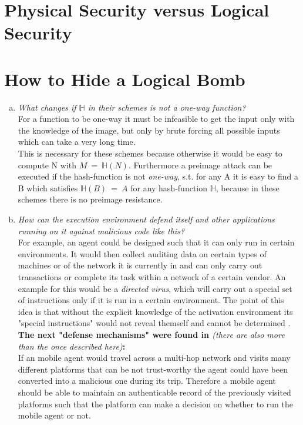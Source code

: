 \documentclass{report}
\begin{document}
	\pagestyle{fancy}
	

	\section{Physical Security versus Logical Security}
	\startsection
		\cite{DG99} \cite{IGDC}
	\closesection
	
	\section{How to Hide a Logical Bomb}
	\startsection
		\begin{enumerate}[a)]
			\item \textit{What changes if $\mathbb{H}$ in their schemes is not a one-way function?} \\
			For a function to be one-way it must be infeasible to get the input only with the knowledge of the image, but only by brute forcing all possible inputs which can take a very long time. \\
			This is necessary for these schemes because otherwise it would be easy to compute N with $M \ = \ \mathbb{H}(N)$. Furthermore a preimage attack can be executed if the hash-function is not \textit{one-way}, s.t. for any A it is easy to find a B which satisfies $\mathbb{H}(B) \ = \ A$ for any hash-function $\mathbb{H}$, because in these schemes there is no preimage resistance.
			\item \textit{How can the execution environment defend itself and other applications running on it against malicious code like this?} \\
			For example, an agent could be designed such that it can only run in certain environments. It would then collect auditing data on certain types of machines or of the network it is currently in and can only carry out transactions or complete its task within a network of a certain vendor. An example for this would be a \textit{directed virus}, which will carry out a special set of instructions only if it is run in a certain environment. The point of this idea is that without the explicit knowledge of the activation environment its "special instructions" would not reveal themself and cannot be determined \cite{Riordan1998EnvironmentalKG}. \\
			\textbf{The next "defense mechanisms" were found in \cite{AB05}} \textit{(there are also more than the once described here)}\textbf{:} \\
			If an mobile agent would travel across a multi-hop network and visits many different platforms that can be not trust-worthy the agent could have been converted into a malicious one during its trip. Therefore a mobile agent should be able to maintain an authenticable record of the previously visited platforms such that the platform can make a decision on whether to run the mobile agent or not. \\

\end{enumerate}
\end{document}
